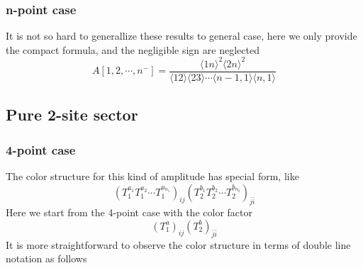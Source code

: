 \documentclass[12pt]{article}
\numberwithin{equation}{section}
\newcommand{\mdavg}[2]{\langle #1 \rangle\!\langle #2 \rangle}
\newcommand{\avg}[1]{\langle #1 \rangle}
\begin{document}
\subsubsection{n-point case}
It is not so hard to generallize these results to general case, here we only provide the compact formula, and the negligible sign are neglected
\begin{equation*}
    A[1,2,\cdots,n^-]=\frac{\avg{1n}^2\avg{2n}^2}{\mdavg{12}{23}\cdots\mdavg{n-1,1}{n,1}}
\end{equation*} 
\subsection{Pure 2-site sector}
\subsubsection{4-point case}
The color structure for this kind of amplitude has special form, like
\begin{equation}
    (T_1^{a_1}T_1^{a_2}\cdots T_1^{a_{n_1}})_{ij}(T_2^{b_1}T_2^{b_2}\cdots T_2^{b_{n_2}})_{\bar{j}\bar{i}}
\end{equation}
Here we start from the 4-point case with the color factor
\begin{equation}
    (T_1^a)_{ij}(T_2^b)_{\bar{j}\bar{i}}
\end{equation}
It is more straightforward to observe the color structure in terms of double line notation as follows 
\vspace{0.5em}
\end{document}
